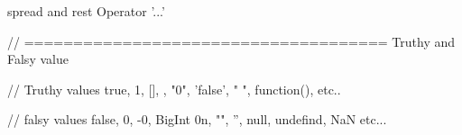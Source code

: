 spread and rest Operator '...' 

// ===================================== 
Truthy and Falsy value

// Truthy values
true, 1, [], {}, "0", 'false', " ", function(){},  etc..

// falsy values
false, 0, -0, BigInt 0n, "", '', null, undefind, NaN etc...

